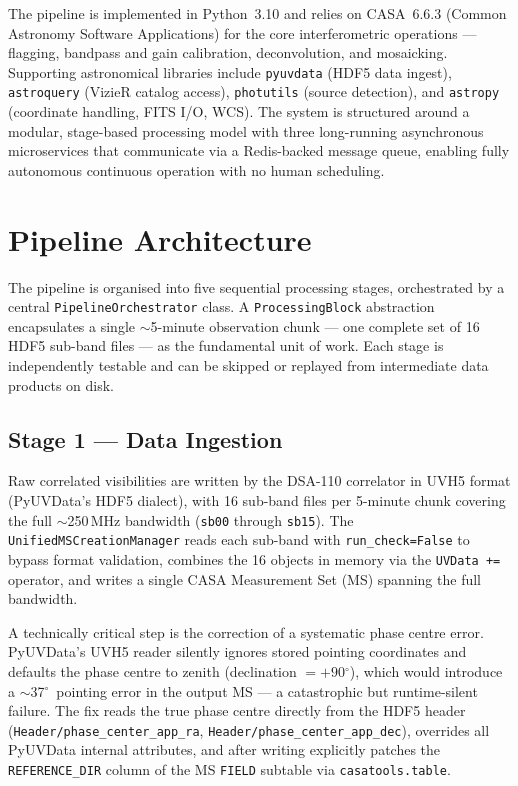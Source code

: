 \documentclass[12pt,a4paper]{article}
\newcommand{\degr}{\ensuremath{^\circ}}
\newcommand{\code}[1]{\colorbox{codegray}{\texttt{\small #1}}}
\begin{document}
The pipeline is implemented in Python~3.10 and relies on CASA~6.6.3 (Common
Astronomy Software Applications) for the core interferometric operations ---
flagging, bandpass and gain calibration, deconvolution, and mosaicking.
Supporting astronomical libraries include \texttt{pyuvdata} (HDF5 data
ingest), \texttt{astroquery} (VizieR catalog access), \texttt{photutils}
(source detection), and \texttt{astropy} (coordinate handling, FITS I/O, WCS).
The system is structured around a modular, stage-based processing model with
three long-running asynchronous microservices that communicate via a
Redis-backed message queue, enabling fully autonomous continuous operation with
no human scheduling.

\section{Pipeline Architecture}

The pipeline is organised into five sequential processing stages, orchestrated
by a central \code{PipelineOrchestrator} class.  A \code{ProcessingBlock}
abstraction encapsulates a single $\sim$5-minute observation chunk --- one
complete set of 16 HDF5 sub-band files --- as the fundamental unit of work.
Each stage is independently testable and can be skipped or replayed from
intermediate data products on disk.

\subsection{Stage 1 --- Data Ingestion}

Raw correlated visibilities are written by the DSA-110 correlator in UVH5
format (PyUVData's HDF5 dialect), with 16 sub-band files per 5-minute chunk
covering the full $\sim$250\,MHz bandwidth (\code{sb00} through \code{sb15}).
The \code{UnifiedMSCreationManager} reads each sub-band with
\code{run\_check=False} to bypass format validation, combines the 16 objects
in memory via the \code{UVData +=} operator, and writes a single CASA
Measurement Set (MS) spanning the full bandwidth.

A technically critical step is the correction of a systematic phase centre
error.  PyUVData's UVH5 reader silently ignores stored pointing coordinates
and defaults the phase centre to zenith (declination $= +90\degr$), which
would introduce a $\sim$37\degr\ pointing error in the output MS --- a
catastrophic but runtime-silent failure.  The fix reads the true phase centre
directly from the HDF5 header (\code{Header/phase\_center\_app\_ra},
\code{Header/phase\_center\_app\_dec}), overrides all PyUVData internal
attributes, and after writing explicitly patches the \code{REFERENCE\_DIR}
column of the MS \code{FIELD} subtable via \code{casatools.table}.
\end{document}
